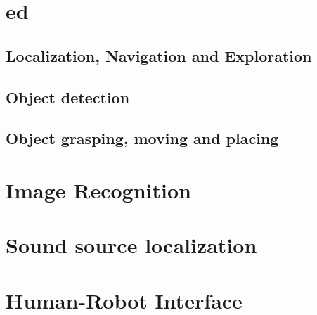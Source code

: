 \documentclass[runningheads,a4paper]{llncs}
\begin{document}
\section{\acrfull{ed}}


\subsection{Localization, Navigation and Exploration}


\subsection{Object detection}


\subsection{Object grasping, moving and placing}


\section{Image Recognition}


\section{Sound source localization}


%

\section{Human-Robot Interface}


%
%
%
\end{document}
